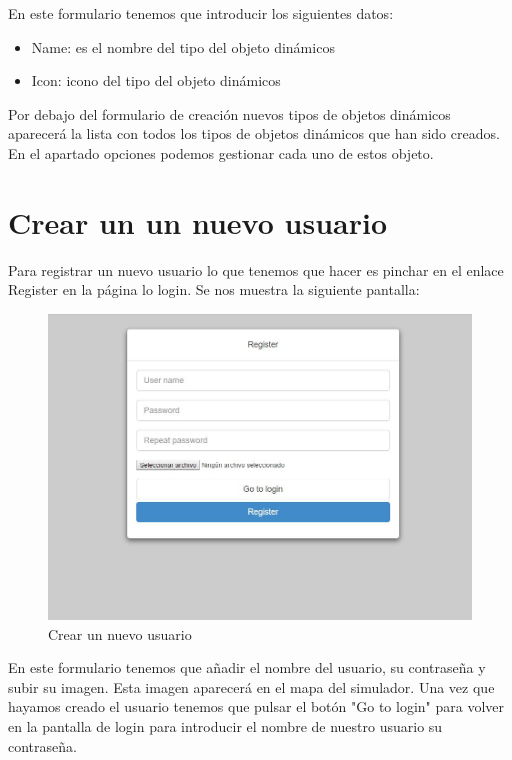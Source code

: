 En este formulario tenemos que introducir los siguientes datos:

\begin{itemize}
	\item Name: es el nombre del tipo del objeto dinámicos
	\item Icon: icono del tipo del objeto dinámicos
\end{itemize}

Por debajo del formulario de creación nuevos tipos de objetos dinámicos aparecerá la lista con todos los tipos de objetos dinámicos que han sido creados. En el apartado opciones podemos gestionar cada uno de estos objeto.

\section{Crear un un nuevo usuario}\label{sec:CrearUsuario}

Para registrar un nuevo usuario lo que tenemos que hacer es pinchar en el enlace Register en la página lo login. Se nos muestra la siguiente pantalla:

\begin{figure}[H]
	\centering\includegraphics[scale=0.3]{imagenes/capitulo5/register.jpg}
	\caption{Crear un nuevo usuario}
	\label{img:AddUser}
\end{figure}

En este formulario tenemos que añadir el nombre del usuario, su contraseña y subir su imagen. Esta imagen aparecerá en el mapa del simulador. Una vez que hayamos creado el usuario tenemos que pulsar el botón "Go to login" para volver en la pantalla de login para introducir el nombre de nuestro usuario su contraseña.

